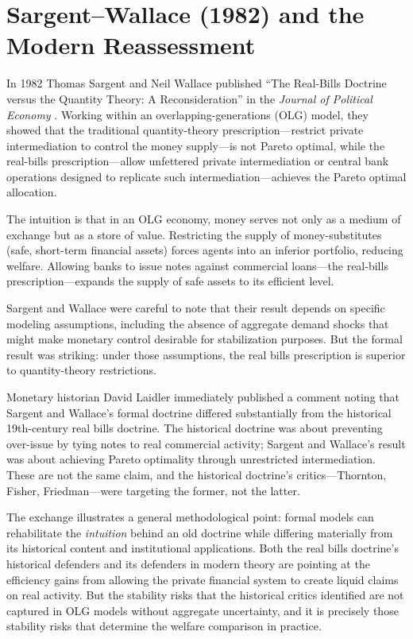 \documentclass[12pt]{article}
\begin{document}
\section{Sargent--Wallace (1982) and the Modern Reassessment}
\label{sec:sargent-wallace}

In 1982 Thomas Sargent and Neil Wallace published ``The Real-Bills
Doctrine versus the Quantity Theory: A Reconsideration'' in the
\textit{Journal of Political Economy} \citep{SargentWallace1982}.
Working within an overlapping-generations (OLG) model, they showed
that the traditional quantity-theory prescription---restrict private
intermediation to control the money supply---is not Pareto optimal,
while the real-bills prescription---allow unfettered private
intermediation or central bank operations designed to replicate such
intermediation---achieves the Pareto optimal allocation.

The intuition is that in an OLG economy, money serves not only as
a medium of exchange but as a store of value.  Restricting the
supply of money-substitutes (safe, short-term financial assets)
forces agents into an inferior portfolio, reducing welfare.
Allowing banks to issue notes against commercial loans---the
real-bills prescription---expands the supply of safe assets to
its efficient level.

Sargent and Wallace were careful to note that their result depends
on specific modeling assumptions, including the absence of aggregate
demand shocks that might make monetary control desirable for
stabilization purposes.  But the formal result was striking: under
those assumptions, the real bills prescription is superior to
quantity-theory restrictions.

Monetary historian David Laidler \citeyearpar{Laidler1984} immediately
published a comment noting that Sargent and Wallace's formal doctrine
differed substantially from the historical 19th-century real bills
doctrine.  The historical doctrine was about preventing over-issue
by tying notes to real commercial activity; Sargent and Wallace's
result was about achieving Pareto optimality through unrestricted
intermediation.  These are not the same claim, and the historical
doctrine's critics---Thornton, Fisher, Friedman---were targeting
the former, not the latter.

The exchange illustrates a general methodological point: formal
models can rehabilitate the \textit{intuition} behind an old
doctrine while differing materially from its historical content
and institutional applications.  Both the real bills doctrine's
historical defenders and its defenders in modern theory are pointing
at the efficiency gains from allowing the private financial system
to create liquid claims on real activity.  But the stability risks
that the historical critics identified are not captured in OLG
models without aggregate uncertainty, and it is precisely those
stability risks that determine the welfare comparison in practice.
\end{document}
